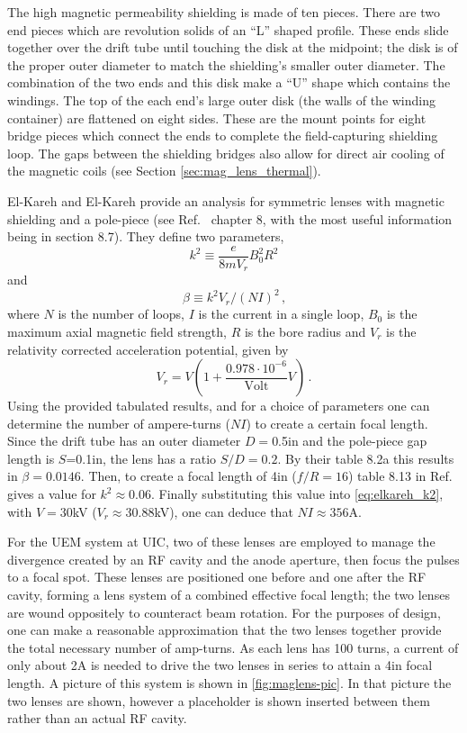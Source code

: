 The high magnetic permeability shielding is made of ten pieces.
There are two end pieces which are revolution solids of an ``L'' shaped profile.
These ends slide together over the drift tube until touching the disk at the midpoint; the disk is of the proper outer diameter to match the shielding's smaller outer diameter.
The combination of the two ends and this disk make a ``U'' shape which contains the windings.
The top of the each end's large outer disk (the walls of the winding container) are flattened on eight sides.
These are the mount points for eight bridge pieces which connect the ends to complete the field-capturing shielding loop.
The gaps between the shielding bridges also allow for direct air cooling of the magnetic coils (see Section \ref{sec:mag_lens_thermal}).

El-Kareh and El-Kareh provide an analysis for symmetric lenses with magnetic shielding and a pole-piece (see Ref.~\cite{el-kareh_electron_1970} chapter 8, with the most useful information being in section 8.7).
They define two parameters,
\begin{equation}
  k^2 \equiv \frac{e}{8 m V_r} B_0^2 R^2
\end{equation}
and
\begin{equation} \label{eq:elkareh_k2}
  \beta \equiv k^2 V_r / (NI)^2 \,\text{,}
\end{equation}
where $N$ is the number of loops, $I$ is the current in a single loop, $B_0$ is the maximum axial magnetic field strength, $R$ is the bore radius and $V_r$ is the relativity corrected acceleration potential, given by
\begin{equation}
  V_r = V ( 1 + \frac{0.978 \cdot 10^{-6}}{\text{Volt}} V ) \,\text{.}
\end{equation}
Using the provided tabulated results, and for a choice of parameters one can determine the number of ampere-turns ($NI$) to create a certain focal length.
Since the drift tube has an outer diameter $D=$0.5in and the pole-piece gap length is $S$=0.1in, the lens has a ratio $S/D=0.2$.
By their table 8.2a this results in $\beta=0.0146$.
Then, to create a focal length of 4in ($f/R=16$) table 8.13 in Ref.~\cite{el-kareh_electron_1970} gives a value for $k^2 \approx 0.06$.
Finally substituting this value into \ref{eq:elkareh_k2}, with $V=30$kV ($V_r\approx30.88$kV), one can deduce that $NI\approx356$A.

For the UEM system at UIC, two of these lenses are employed to manage the divergence created by an RF cavity and the anode aperture, then focus the pulses to a focal spot. 
These lenses are positioned one before and one after the RF cavity, forming a lens system of a combined effective focal length; the two lenses are wound oppositely to counteract beam rotation.
For the purposes of design, one can make a reasonable approximation that the two lenses together provide the total necessary number of amp-turns.
As each lens has 100 turns, a current of only about 2A is needed to drive the two lenses in series to attain a 4in focal length.
A picture of this system is shown in \ref{fig:maglens-pic}.
In that picture the two lenses are shown, however a placeholder is shown inserted between them rather than an actual RF cavity.

